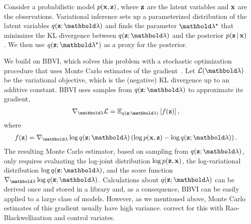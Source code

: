 \documentclass[]{article}
\begin{document}
 Consider a probabilistic model
$p(\mathbf{x},\mathbf{z})$, where $\mathbf{z}$ are the latent variables and $\mathbf{x}$ are the
observations. Variational inference sets up a parameterized
distribution of the latent variables $q(\bz; \blambda)$ and finds the
parameter $\blambda^\star$ that minimizes the \gls{KL} divergence
between $q(\bz; \blambda)$ and the posterior $p(\mathbf{z} \, | \, \mathbf{x})$. We then
use $q(\bz; \blambda^\star)$ as a proxy for the posterior.

We build on \gls{BBVI}, which solves this problem with a stochastic
optimization procedure that uses Monte Carlo estimates of the
gradient~\citep{Ranganath2014}. Let $\cL(\blambda)$ be the variational
objective, which is the (negative) \gls{KL}
divergence up to an additive constant. \gls{BBVI} uses samples from
$q(\bz; \blambda)$ to approximate its gradient,
\begin{align}\label{eq:reinforce}
	\nabla_{\blambda} \cL = \E{q(\bz; \blambda)}{f(\bz)},
\end{align}
where
\begin{align}\label{eq:fz}
  f(\bz) = \nabla_{\blambda} \log q(\bz;\blambda) \left(\log p(\bx,\bz)-\log q(\bz;\blambda)\right).
\end{align}
The resulting Monte Carlo estimator, based on sampling from
$q(\bz;\blambda)$, only requires evaluating the log-joint distribution
$\log p(\mathbf{z}, \mathbf{x})$, the log-variational distribution
$\log q(\bz; \blambda)$, and the score function
$\nabla_{\blambda} \log q(\bz;\blambda)$.  Calculations about
$q(\bz; \blambda)$ can be derived once and stored in a library and, as
a consequence, \gls{BBVI} can be easily applied to a large class of
models. However, as we mentioned above, Monte Carlo estimates of this
gradient usually have high variance. \citet{Ranganath2014} correct for
this with Rao-Blackwellization and control variates.


%
\end{document}
